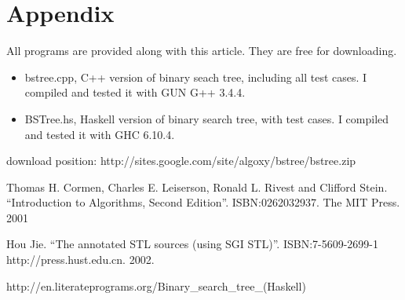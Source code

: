 \documentclass{article}
\begin{document}
\section{Appendix} \label{appendix}
All programs are provided along with this article. They are free for downloading.
\begin{itemize}
\item bstree.cpp, C++ version of binary seach tree, including all test cases. I 
compiled and tested it with GUN G++ 3.4.4.
\item BSTree.hs, Haskell version of binary search tree, with test cases. I compiled
and tested it with GHC 6.10.4.
\end{itemize}
download position: http://sites.google.com/site/algoxy/bstree/bstree.zip

\begin{thebibliography}{99}

Thomas H. Cormen, Charles E. Leiserson, Ronald L. Rivest and Clifford Stein. 
``Introduction to Algorithms, Second Edition''. ISBN:0262032937. The MIT Press. 2001

Hou Jie. ``The annotated STL sources (using SGI STL)''. ISBN:7-5609-2699-1 http://press.hust.edu.cn. 2002.

http://en.literateprograms.org/Binary\_search\_tree\_(Haskell)

\end{thebibliography}

\ifx\wholebook\relax\else
\end{document}
